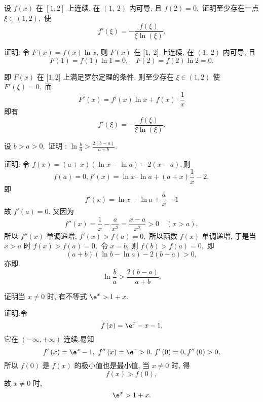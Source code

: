 \begin{problem}
设 $f\left( x \right)$ {在}
$\left\lbrack 1,2 \right\rbrack$ {上连续, 在} $(1,\ 2)$
{内可导, 且} $f\left( 2 \right) = 0,$ {证明至少存在一点}
$\xi \in \left( 1,2 \right),$ {使}
$$f'\left( \xi \right) = - \frac{f\left( \xi \right)}{\xi\ln\left( \xi \right)}.$$

\begin{solution}
{证明: 令} $F\left( x \right) = f\left( x \right)\ln x${,
	则} $F\left( x \right)$ {在} $\lbrack 1,\ 2\rbrack$
{上连续, 在} $(1,\ 2)$ {内可导, 且}
$$F\left( 1 \right) = f\left( 1 \right)\ln 1 = 0,\quad F\left( 2 \right) = f\left( 2 \right)\ln 2 = 0.$$

{即} $F\left( x \right)$ {在} $\lbrack 1,2\rbrack$
{上满足罗尔定理的条件, 则至少存在}
$\xi \in \left( 1, 2 \right)$ {使}
$F'\left( \xi \right) = 0,$ {而}
$$F'\left( x \right) = f'\left( x \right)\ln x + f\left( x \right) \cdot \frac{1}{x}$$
{即有}
$$f'\left( \xi \right) = - \frac{f\left( \xi \right)}{\xi\ln\left( \xi \right)}.$$

\end{solution}

\end{problem}           

\begin{problem} 设 $b > a > 0,$ {证明 :}
$\displaystyle \ln\frac{b}{a} > \frac{2\left( b - a \right)}{a + b}.$

\begin{solution}
证明: 令
$f\left( x \right) = \left( a + x \right)\left( \ln x - \ln a \right) - 2\left( x - a \right),$则
$$f\left( a \right) = 0,f'\left( x \right) = \ln x–\ln a + \left( a + x \right)\frac{1}{x} - 2,$$
{即}
$$f'\left( x \right) = \ln x - \ln a + \frac{a}{x} - 1$$
{故} $f'\left( a \right) = 0.$ {又因为}
$$f''\left( x \right) = \frac{1}{x} - \frac{a}{x^{2}} = \frac{x - a}{x^{2}} > 0\quad\left( x > a \right),$$
{所以} $f''\left( x \right)$ {单调递增,}
$f'\left( x \right) > f\left( a \right) = 0,$ {所以函数}
$f\left( x \right)$ {单调递增, 于是当} $x > a$ {时}
$f\left( x \right) > f\left( a \right) = 0,$ {令}
$x = b${, 则} $f\left( b \right) > f\left( a \right) = 0,$
{即}
$$\left( a + b \right)\left( \ln b - \ln a \right) - 2\left( b - a \right) > 0,$$
{亦即}
$$\ln\frac{b}{a} > \frac{2\left( b - a \right)}{a + b}.$$
\end{solution}

\end{problem}           

\begin{problem} 证明当 $x \neq 0$ {时, 有不等式} $\e^{x} > 1 + x.$

\begin{solution}
证明:令 $$f\left( x \right) = \e^{x} - x - 1,$$
它在
$\left( - \infty, + \infty \right)$ 连续.易知
$$f'\left( x \right) = \e^{x} - 1,\ f''\left( x \right) = \e^{x} > 0.\
f'\left( 0 \right) = 0,f''\left( 0 \right) > 0,$$
所以
$f\left( 0 \right)$ {是} $f\left( x \right)$
{的极小值也是最小值, 当} $x \neq 0$ {时, 得}
$$f\left( x \right) > f\left( 0 \right),$$ {故} $x \neq 0$
{时,}
$$\e^{x} > 1 + x.$$
\end{solution}

\end{problem} 